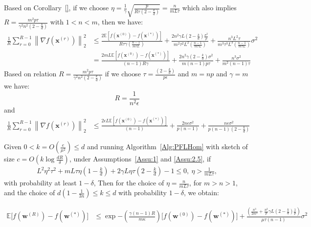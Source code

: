 \begin{corollary}
Based on Corollary~\ref{}, if we choose $\eta=\frac{1}{\gamma}\sqrt{\frac{p}{R\tau\left(2-\frac{k}{d}\right)}}=\frac{n}{mL\tau}$ which also  implies $R=\frac{m^2p\tau}{\gamma^2n^2\left(2-\frac{k}{d}\right)}$ with $1<n<m$, then we have:
\begin{align}
        \frac{1}{R}\sum_{r=0}^{R-1}\left\|\nabla f({\boldsymbol{x}}^{(r)})\right\|_2^2&\leq \frac{2 \mathbb{E}\left[f({\boldsymbol{x}}^{(0)})-f({\boldsymbol{x}}^{(*)})\right]}{R\tau \gamma \left(\frac{n-1}{m\tau L}\right)}+\frac{2n^2\gamma L\left(2-\frac{k}{d}\right)\frac{\sigma^2}{p}}{m^2\tau^2L^2 \left(\frac{n-1}{m\tau L}\right)}+\frac{n^3L^2\tau}{m^3\tau^3L^3\left(\frac{n-1}{m\tau L}\right)}\sigma^2\nonumber\\
        &=\frac{2mL \mathbb{E}\left[f({\boldsymbol{x}}^{(0)})-f({\boldsymbol{x}}^{(*)})\right]}{\left(n-1\right)R \gamma }+\frac{2n^2\gamma \left(2-\frac{k}{d}\right)\sigma^2}{m\left(n-1\right) p\tau  }+\frac{n^3\sigma^2}{m^2\left(n-1\right)\tau}
\end{align}
Based on relation $R=\frac{m^2p\tau}{\gamma^2n^2\left(2-\frac{k}{d}\right)}$ if we choose $\tau=\frac{\left(2-\frac{k}{d}\right)}{p\epsilon}$ and $m=np$ and $\gamma=m$ we have:
$$R=\frac{1}{n^2\epsilon}$$ and 
\begin{align}
     \frac{1}{R}\sum_{r=0}^{R-1}\left\|\nabla f({\boldsymbol{x}}^{(r)})\right\|_2^2&\leq \frac{2\epsilon L \mathbb{E}\left[f({\boldsymbol{x}}^{(0)})-f({\boldsymbol{x}}^{(*)})\right]}{\left(n-1\right)}+\frac{2n\epsilon \sigma^2}{p\left(n-1\right)}+\frac{n\epsilon\sigma^2}{p\left(n-1\right)\left(2-\frac{k}{d}\right)}
\end{align}
\end{corollary}

\begin{theorem}
Given $0<k=O\left(\frac{e}{\mu^2}\right)\leq d$
and running Algorithm~\ref{Alg:PFLHom} with sketch of size $c=O\left(k\log \frac{d R}{\delta}\right)$,  under Assumptions~\ref{Assu:1} and \ref{Assu:2.5}, if 
\begin{align}
       L^2\eta^2\tau^2+mL\tau\eta\left(1-\frac{k}{d}\right)+2\gamma L\eta\tau\left(2-\frac{k}{d}\right)-1\leq 0,\:\eta> \frac{1}{mL\tau},\label{eq:cnd-lrs-h-ii} 
\end{align}
with probability at least $1-\delta$, Then for the choice of $\eta=\frac{n}{mL\tau}$, for $m>n>1$, and the choice of $ d\left(1-\frac{1}{3n}\right)\leq k\leq d$ with probability $1-\delta$,  we obtain:


\begin{align}
                \mathbb{E}\Big[f({\boldsymbol{w}}^{(R)})-f({\boldsymbol{w}}^{(*)})\Big]&\leq\exp{-\left(\frac{\gamma\left(n-1\right) R}{m\kappa}\right) }\Big[f({\boldsymbol{w}}^{(0)})-f({\boldsymbol{w}}^{(*)})\Big]+\frac{\left(\frac{ n^3}{2m^2}+\frac{n^2}{p}\gamma L\left(2-\frac{k}{d}\right)\frac{1}{p} \right)}{\mu\tau\left(n-1\right)}\sigma^2
\end{align}

\end{theorem}




